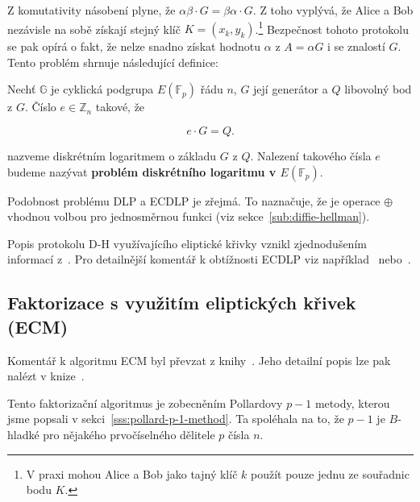 \documentclass[
  program=infoi,
  biblatex=false,
  figures=true,
  glossaries,
  tables=false,
  sourcecodes=true,
  index
]{kidiplom}
\begin{document}
        Z komutativity násobení plyne, že $\alpha \beta \cdot G = \beta \alpha \cdot G$.
        Z toho vyplývá, že Alice a Bob nezávisle na sobě získají stejný klíč $K = (x_k, y_k)$.\footnote{V praxi
        mohou Alice a Bob jako tajný klíč $k$ použít pouze jednu ze souřadnic bodu $K$.}
        Bezpečnost tohoto protokolu se pak opírá o fakt, že nelze snadno získat hodnotu $\alpha$ z $A = \alpha G$ i se znalostí $G$.
        Tento problém shrnuje následující definice:

        \begin{definition}\label{def:elliptic-curve-dlp}
        
                Nechť $\mathbb{G}$ je cyklická podgrupa $E(\mathbb{F}_p)$ řádu $n$, $G$ její generátor a $Q$ libovolný bod z $G$.
                Číslo $e \in \mathbb{Z}_n$ takové, že
        
                    \begin{equation}\label{eq:elliptic-curve-dlp}
                        e \cdot G = Q.
                    \end{equation}

                \noindent
                nazveme diskrétním logaritmem o základu $G$ z $Q$.
                Nalezení takového čísla $e$ budeme nazývat \textbf{problém diskrétního logaritmu v $E(\mathbb{F}_p)$}.

        \end{definition}

        Podobnost problému DLP a ECDLP je zřejmá.
        To naznačuje, že je operace $\oplus$ vhodnou volbou pro jednosměrnou funkci (viz sekce~\ref{sub:diffie-hellman}).

        Popis protokolu D-H využívajícího eliptické křivky vznikl zjednodušením informací z~\cite{pair-wise-key-establishment}.
        Pro detailnější komentář k obtížnosti ECDLP viz například~\cite{graduate-course} nebo~\cite{guide-elliptic-curve}.


    \subsection{Faktorizace s využitím eliptických křivek (ECM)}

        Komentář k algoritmu ECM byl převzat z knihy~\cite{handbook}.
        Jeho detailní popis lze pak nalézt v knize~\cite{elliptic-curves}.

        Tento faktorizační algoritmus je zobecněním Pollardovy $p-1$ metody, kterou jsme popsali v sekci~\ref{sss:pollard-p-1-method}.
        Ta spoléhala na to, že $p-1$ je $B$-hladké pro nějakého prvočíselného dělitele $p$ čísla $n$.
\end{document}
